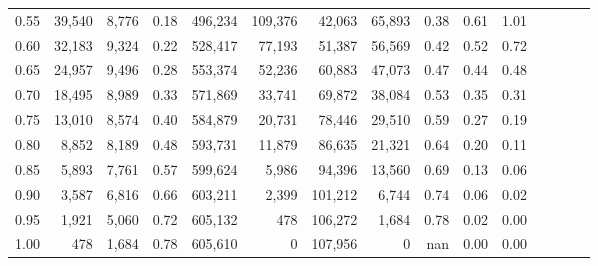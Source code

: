 \begin{tabular}{rrrcrrrrrrrrrrr}
0.55 &  39,540 &  8,776 &                                       0.18 &  496,234 &  109,376 &   42,063 &   65,893 &  0.38 &  0.61 &                         1.01 \\
0.60 &  32,183 &  9,324 &                                       0.22 &  528,417 &   77,193 &   51,387 &   56,569 &  0.42 &  0.52 &                         0.72 \\
0.65 &  24,957 &  9,496 &                                       0.28 &  553,374 &   52,236 &   60,883 &   47,073 &  0.47 &  0.44 &                         0.48 \\
0.70 &  18,495 &  8,989 &                                       0.33 &  571,869 &   33,741 &   69,872 &   38,084 &  0.53 &  0.35 &                         0.31 \\
0.75 &  13,010 &  8,574 &                                       0.40 &  584,879 &   20,731 &   78,446 &   29,510 &  0.59 &  0.27 &                         0.19 \\
0.80 &   8,852 &  8,189 &                                       0.48 &  593,731 &   11,879 &   86,635 &   21,321 &  0.64 &  0.20 &                         0.11 \\
0.85 &   5,893 &  7,761 &                                       0.57 &  599,624 &    5,986 &   94,396 &   13,560 &  0.69 &  0.13 &                         0.06 \\
0.90 &   3,587 &  6,816 &                                       0.66 &  603,211 &    2,399 &  101,212 &    6,744 &  0.74 &  0.06 &                         0.02 \\
0.95 &   1,921 &  5,060 &                                       0.72 &  605,132 &      478 &  106,272 &    1,684 &  0.78 &  0.02 &                         0.00 \\
1.00 &     478 &  1,684 &                                       0.78 &  605,610 &        0 &  107,956 &        0 &   nan &  0.00 &                         0.00 \\
\bottomrule
\end{tabular}
